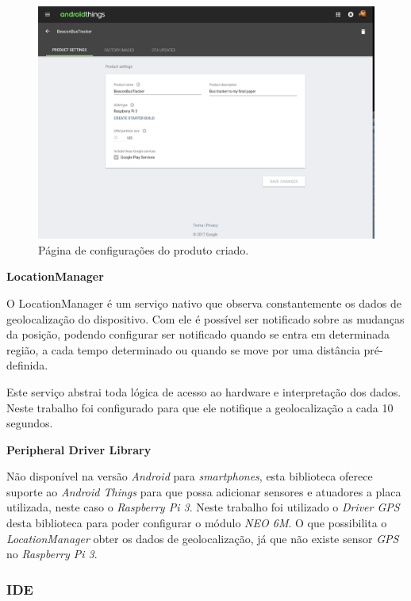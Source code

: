\documentclass[
	12pt,				%
	oneside,			%
	a4paper,			%
	brazil				%
]{abntex2}
\begin{document}
\begin{figure}[H]
\centering
\includegraphics[width=15cm, center]{images/android-things-console-settings}
\caption{Página de configurações do produto criado.}
\label{Rotulo}
\end{figure}

\textbf{LocationManager}

O LocationManager é um serviço nativo que observa constantemente os dados de geolocalização do dispositivo. Com ele é possível ser notificado sobre as mudanças da posição, podendo configurar ser notificado quando se entra em determinada região, a cada tempo determinado ou quando se move por uma distância pré-definida. 

Este serviço abstrai toda lógica de acesso ao hardware e interpretação dos dados. Neste trabalho foi configurado para que ele notifique a geolocalização a cada 10 segundos.

\textbf{Peripheral Driver Library}

Não disponível na versão \textit{Android} para \textit{smartphones}, esta biblioteca oferece suporte ao \textit{Android Things} para que possa adicionar sensores e atuadores a placa utilizada, neste caso o \textit{Raspberry Pi 3}. Neste trabalho foi utilizado o \textit{Driver GPS} desta biblioteca para poder configurar o módulo \textit{NEO 6M}. O que possibilita o \textit{LocationManager} obter os dados de geolocalização, já que não existe sensor \textit{GPS} no \textit{Raspberry Pi 3}.

\subsubsection{IDE}
\end{document}
